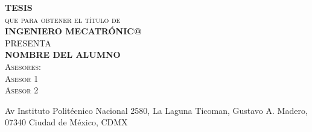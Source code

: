 \begin{center}
	\textbf{\textsc{\LARGE T\qquad E\qquad S\qquad I\qquad S}}\\
	\vspace{10mm}
	\textsc{\LARGE que para obtener el t\'itulo de}\\
	\vspace{10mm}
	\textbf{\textsc{\LARGE INGENIERO MECATR\'ONIC@}}\\
	\vspace{10mm}
	\textsc{\LARGE PRESENTA}\\
	\vspace{10mm}
	\textbf{\textsc{\LARGE NOMBRE DEL ALUMNO}}\\
	\vspace{15mm}
	\textsc{\Large Asesores:}\\
	\vspace{5mm}
	\textsc{\Large Asesor 1}\\
	\textsc{\Large Asesor 2}
	
	\begin{center}
		Av Instituto Politécnico Nacional 2580, La Laguna Ticoman, Gustavo A. Madero, 07340 Ciudad de México, CDMX
	\end{center}

\end{center}
